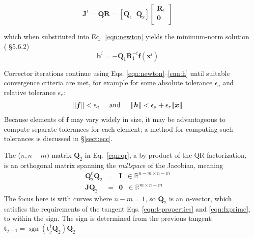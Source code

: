 \documentclass[11pt,openany,twoside]{book}
\numberwithin{equation}{section}		%
\DeclareMathOperator\sgn{sgn}
\newcommand{\Matrix}[1]{\boldsymbol{#1}}
\newcommand{\Vector}[1]{\boldsymbol{#1}}
\newcommand{\Sectref}[1]{\S\ref{#1}}
\newcommand{\Eqn}[1]{Eq.\ \ref{#1}}  %
\newcommand{\Eqnr}[2]{Eqs. \ref{#1}--\ref{#2}}  %
\newcommand{\Eqna}[2]{Eqs. \ref{#1} and \ref{#2}}  %
\begin{document}
\begin{equation}
\label{eqn:qr}
\Matrix{J}^{t} = \Matrix{QR} = \left[ \Matrix{Q}_1 \;\; \Matrix{Q}_2 \right]
	\left[ \begin{array}{c}
		\Matrix{R}_1 \\
		\Matrix{0} \\
	\end{array}\right]
\end{equation}

which when substituted into \Eqn{eqn:newton} yields the
minimum-norm solution (\cite{golub2013matrix} \S 5.6.2)
\begin{equation}
\label{eqn:h}
\Vector{h}^i = - \Matrix{Q}_{1} \Matrix{R}_{1}^{-t} \Vector{f}(\Vector{x}^i)
\end{equation}

Corrector iterations continue using \Eqnr{eqn:newton}{eqn:h} until
suitable convergence criteria are met, for example for some absolute
tolerance $\epsilon_{a}$ and relative tolerance $\epsilon_{r}$:
\begin{equation}
\| \Vector{f} \| < \epsilon_{a} \hspace{0.2in} \text{and} \hspace{0.2in} \| \Vector{h} \| < \epsilon_{a} + \epsilon_{r}\| \Vector{x} \|
\end{equation}
Because elements of $\Vector{f}$ may vary widely in size, it may be advantageous
to compute separate tolerances for each element; a method for computing such
tolerances is discussed in \Sectref{sect:ecc}.
\par
The ($n,n-m)$ matrix $\Matrix{Q}_2$ in \Eqn{eqn:qr},
a by-product of the QR factorization,
is an orthogonal matrix spanning the \textit{nullspace} of the Jacobian,
meaning
\begin{eqnarray}
\Matrix{Q}_{2}^t\Matrix{Q}_2 & = & \Matrix{I} \;\;  \in \mathbb{R}^{n-m \times n-m} \\
\Matrix{JQ}_2 & = & \Matrix{0} \;\; \in \mathbb{R}^{m \times n-m} \nonumber
\end{eqnarray}
The focus here is with curves where $n-m=1$, so $\Matrix{Q}_2$ is an $n$-vector,
which satisfies the requirements of the tangent \Eqna{eqn:t-properties}{eqn:fxprime},
to within the sign. The sign is determined from the previous
tangent: $\Vector{t}_{j+1} = \sgn(\Vector{t}_j^t \Vector{Q}_2) \Vector{Q}_2$
 

\end{document}
